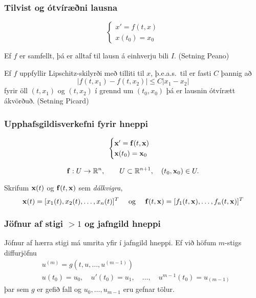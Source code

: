 \documentclass[icelandic,a4paper,12pt]{article}
\newcommand{\R}{{\mathbb  R}}
\begin{document}
\subsubsection{Tilvist og ótvíræðni lausna} 
\begin{equation*}
\begin{cases}
x' = f(t,x)\\
x(t_0) = x_0
\end{cases}
\end{equation*}

Ef $f$ er samfellt, þá er alltaf til lausn á einhverju bili $I$. 
(Setning Peano)

\pause
\smallskip
Ef $f$ uppfyllir Lipschitz-skilyrði með tilliti til $x$, 
þ.e.a.s.~til er fasti $C$ þannig að 
\begin{equation*}
|f(t,x_1) - f(t,x_2)| \leq C|x_1 - x_2|
\end{equation*}
fyrir öll $(t,x_1)$ og $(t,x_2)$ í grennd um $(t_0, x_0)$ þá er
lausnin ótvírætt ákvörðuð. (Setning Picard) 



\subsubsection{Upphafsgildisverkefni fyrir hneppi} 
\begin{equation*}
\begin{cases}
\mbox{${\bf x}$}' =\mbox{${\bf f}$}(t,\mbox{${\bf x}$})\\
\mbox{${\bf x}$}(t_0) = \mbox{${\bf x}$}_0
\end{cases}
\end{equation*}

$$
\fv: U \rightarrow \R^n, \qquad U\subset \mathbb{R}^{n+1}, \quad
(t_0,\xv_0) \in U.
$$ 

\pause
\smallskip
Skrifum  $\mbox{${\bf x}$}(t)$ og $\mbox{${\bf f}$}(t,\mbox{${\bf x}$})$ sem {\it dálkvigra},
$$\mbox{${\bf x}$}(t) = [x_1(t), x_2(t), \ldots , x_n(t)]^T
\quad \text{  og } \quad 
\mbox{${\bf f}$}(t,\mbox{${\bf x}$}) = [f_1(t,\mbox{${\bf x}$}), \ldots , f_n(t, \mbox{${\bf x}$})]^T
$$



\subsubsection{Jöfnur af stigi $>1$ og jafngild hneppi}
Jöfnur af hærra stigi má umrita yfir í jafngild hneppi. 
Ef við höfum $m$-stigs diffurjöfnu
\begin{align*}
&u^{(m)} = g(t,u, \ldots , u^{(m-1)})\\
&u(t_0) = u_0, \quad u'(t_0) = u_1, \quad \ldots, \quad  u^{m-1}(t_0) = u_{(m-1)}
\end{align*}
þar sem $g$ er gefið fall og $u_0, \ldots , u_{m-1}$ eru gefnar tölur.
\end{document}
